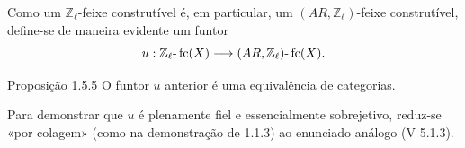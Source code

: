 Como um \(\mathbb Z_\ell\)-feixe construtível é, em particular, um \((AR,\mathbb Z_\ell)\)-feixe construtível, define-se de maneira evidente um funtor
\[
u:\mathbb Z_\ell\text{-}\operatorname{fc}(X)\longrightarrow (AR,\mathbb Z_\ell)\text{-}\operatorname{fc}(X).
\]

\begin{statement}{Proposição 1.5.5}
O funtor \(u\) anterior é uma equivalência de categorias.
\end{statement}

\begin{prooftext}[Demonstração]
Para demonstrar que \(u\) é plenamente fiel e essencialmente sobrejetivo, reduz-se «por colagem» (como na demonstração de 1.1.3) ao enunciado análogo (V 5.1.3).
\end{prooftext}
